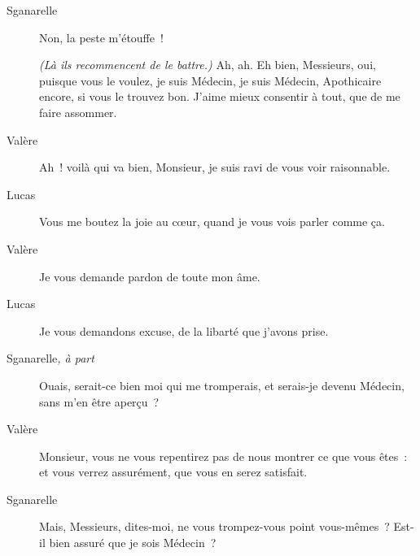 \documentclass[french,twoside]{book} %
\begin{document}
 \begin{description} \item[Sganarelle] 

Non, la peste m’étouffe !

\textit{(Là ils recommencent de le battre.)} Ah, ah. Eh bien, Messieurs, oui, puisque vous le voulez, je suis Médecin, je suis Médecin, Apothicaire encore, si vous le trouvez bon. J’aime mieux consentir à tout, que de me faire assommer.\end{description}
 \begin{description} \item[Valère] 

Ah ! voilà qui va bien, Monsieur, je suis ravi de vous voir raisonnable.\end{description}
 \begin{description} \item[Lucas] 

Vous me boutez la joie au cœur, quand je vous vois parler comme ça.\end{description}
 \begin{description} \item[Valère] 

Je vous demande pardon de toute mon âme.\end{description}
 \begin{description} \item[Lucas] 

Je vous demandons excuse, de la libarté que j’avons prise.\end{description}
 \begin{description} \item[Sganarelle\textit{, à part}\par
] 

Ouais, serait-ce bien moi qui me tromperais, et serais-je devenu Médecin, sans m’en être aperçu ?\end{description}
 \begin{description} \item[Valère] 

Monsieur, vous ne vous repentirez pas de nous montrer ce que vous êtes : et vous verrez assurément, que vous en serez satisfait.\end{description}
 \begin{description} \item[Sganarelle] 

Mais, Messieurs, dites-moi, ne vous trompez-vous point vous-mêmes ? Est-il bien assuré que je sois Médecin ?\end{description}
\end{document}
